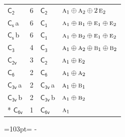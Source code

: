 \documentclass[10pt,a4paper]{article}
\newcommand{\needspace}[1]{\par\penalty-100\begingroup\dimen0=#1\relax\dimen2=\pagegoal
  \advance\dimen2-\pagetotal\ifdim\dimen0>\dimen2\relax\ifdim\dimen2>0pt\vfil\break\fi\fi
  \endgroup}
\numberwithin{equation}{section}
\newcommand{\grp}[1]{\mathsf{#1}}
\newcommand{\irr}[1]{\text{\normalfont\scshape #1}}
\newcommand{\clsletter}[1]{\,{\scriptsize\color{black!55}#1}}
\newlength{\fillwidth}\newlength{\cellwidth}\newlength{\colwidth}
\begin{document}
{\begin{longtable}{@{}lrl>{\RaggedRight\arraybackslash}p{\fillwidth}@{}}
\href{C2.pdf}{$\grp{C_{2}}$} & 6 & \href{C2.pdf}{$\grp{C_{2}}$} & $\irr{a}_{1}\oplus \irr{a}_{2}\oplus 2\,\irr{e}_{2}$\\
\href{C1v.pdf}{$\grp{C_{s}}$}\clsletter{a} & 6 & \href{C1.pdf}{$\grp{C_{1}}$} & $\irr{a}_{1}\oplus \irr{b}_{1}\oplus \irr{e}_{1}\oplus \irr{e}_{2}$\\
\href{C1v.pdf}{$\grp{C_{s}}$}\clsletter{b} & 6 & \href{C1.pdf}{$\grp{C_{1}}$} & $\irr{a}_{1}\oplus \irr{b}_{2}\oplus \irr{e}_{1}\oplus \irr{e}_{2}$\\
\href{C3.pdf}{$\grp{C_{3}}$} & 4 & \href{C3.pdf}{$\grp{C_{3}}$} & $\irr{a}_{1}\oplus \irr{a}_{2}\oplus \irr{b}_{1}\oplus \irr{b}_{2}$\\
\href{C2v.pdf}{$\grp{C_{2v}}$} & 3 & \href{C2.pdf}{$\grp{C_{2}}$} & $\irr{a}_{1}\oplus \irr{e}_{2}$\\
\href{C6.pdf}{$\grp{C_{6}}$} & 2 & \href{C6.pdf}{$\grp{C_{6}}$} & $\irr{a}_{1}\oplus \irr{a}_{2}$\\
\href{C3v.pdf}{$\grp{C_{3v}}$}\clsletter{a} & 2 & \href{C3v.pdf}{$\grp{C_{3v}}$}\clsletter{a} & $\irr{a}_{1}\oplus \irr{b}_{1}$\\
\href{C3v.pdf}{$\grp{C_{3v}}$}\clsletter{b} & 2 & \href{C3v.pdf}{$\grp{C_{3v}}$}\clsletter{b} & $\irr{a}_{1}\oplus \irr{b}_{2}$\\*
\href{C6v.pdf}{$\grp{C_{6v}}$} & 1 & \href{C6v.pdf}{$\grp{C_{6v}}$} & $\irr{a}_{1}$\\
\bottomrule\end{longtable}}
\needspace{103pt}
\end{document}
